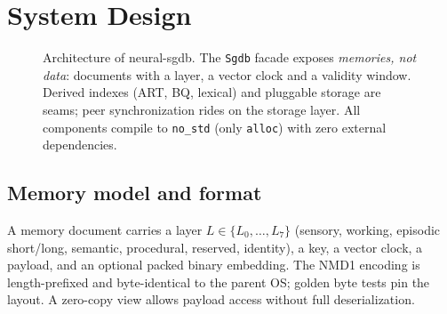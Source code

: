 \documentclass[11pt,twocolumn]{article}
\newcommand{\neural}{{\sf neural-sgdb}}
\begin{document}
\section{System Design}
\label{sec:design}

\begin{figure}[t]
\centering
{}
\caption{Architecture of \neural{}. The \texttt{Sgdb} facade exposes
\emph{memories, not data}: documents with a layer, a vector clock and a
validity window. Derived indexes (ART, BQ, lexical) and pluggable storage are
seams; peer synchronization rides on the storage layer. All components compile
to \texttt{no\_std} (only \texttt{alloc}) with zero external dependencies.}
\label{fig:arch}
\end{figure}

\subsection{Memory model and format}
\label{sec:model}

A memory document carries a layer $L \in \{L_0,\dots,L_7\}$ (sensory, working,
episodic short/long, semantic, procedural, reserved, identity), a key, a
vector clock, a payload, and an optional packed binary embedding. The NMD1
encoding is length-prefixed and byte-identical to the parent OS; golden byte
tests pin the layout. A zero-copy view allows payload access without full
deserialization.
\end{document}
